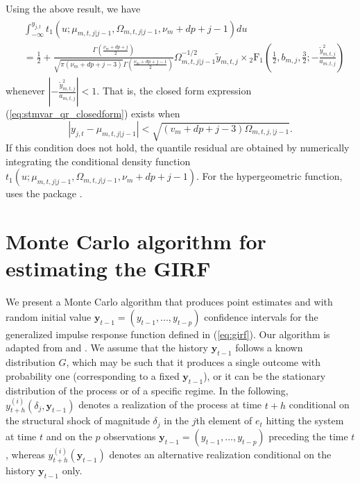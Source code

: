 \documentclass[nojss]{jss}
\begin{document}
\begin{appendix}
Using the above result, we have
\begin{align}\label{eq:stmvar_qr_closedform}
\begin{aligned}
&\int_{-\infty}^{y_{j,t}}t_1(u;\mu_{m,t,j|j-1},\Omega_{m,t,j|j-1},\nu_m + dp + j - 1)du \\
&= \frac{1}{2} + \frac{\Gamma\left(\frac{\nu_m + dp + j}{2}\right)}{\sqrt{\pi (\nu_m + dp + j - 3)}\Gamma\left(\frac{\nu_m + dp + j - 1}{2} \right)}\Omega_{m,t,j|j-1}^{-1/2}\tilde{y}_{m,t,j} \times {}_2\text{F}_1\left(\frac{1}{2}, b_{m,j}, \frac{3}{2}; -\frac{\tilde{y}_{m,t,j}^2}{a_{m,t,j}} \right)
\end{aligned}
\end{align}
whenever $\left|-\frac{\tilde{y}_{m,t,j}^2}{a_{m,t,j}}\right|<1$.  That is,  the closed form expression (\ref{eq:stmvar_qr_closedform}) exists when
\begin{equation}
|y_{j,t} - \mu_{m,t,j|j-1}| < \sqrt{(v_m + dp + j - 3)\Omega_{m,t,j,|j-1}}.
\end{equation}
If this condition does not hold, the quantile residual are obtained by numerically integrating the conditional density function $t_1(u;\mu_{m,t,j|j-1},\Omega_{m,t,j|j-1},\nu_m + dp + j - 1)$. For the hypergeometric function,  uses the package  \citep{gsl}.


\section{Monte Carlo algorithm for estimating the GIRF}\label{sec:montecarlo}

We present a Monte Carlo algorithm that produces point estimates and with random initial value $\boldsymbol{y}_{t-1}=(y_{t-1},...,y_{t-p})$ confidence intervals for the generalized impulse response function defined in (\ref{eq:girf}). Our algorithm is adapted from \citet[pp. 135-136]{Koop+Pesaran+Potter:1996} and \citet[pp. 601-602]{Kilian+Lutkepohl:2017}. We assume that the history $\boldsymbol{y}_{t-1}$ follows a known distribution $G$, which may be such that it produces a single outcome with probability one (corresponding to a fixed $\boldsymbol{y}_{t-1}$), or it can be the stationary distribution of the process or of a specific regime. In the following, $y_{t+h}^{(i)}(\delta_j,\boldsymbol{y}_{t-1})$ denotes a realization of the process at time $t+h$ conditional on the structural shock of magnitude $\delta_j$ in the $j$th element of $e_t$ hitting the system at time $t$ and on the $p$ observations $\boldsymbol{y}_{t-1}=(y_{t-1},...,y_{t-p})$ preceding the time $t$, whereas $y_{t+h}^{(i)}(\boldsymbol{y}_{t-1})$ denotes an alternative realization conditional on the history $\boldsymbol{y}_{t-1}$ only.


\end{appendix}
\end{document}
